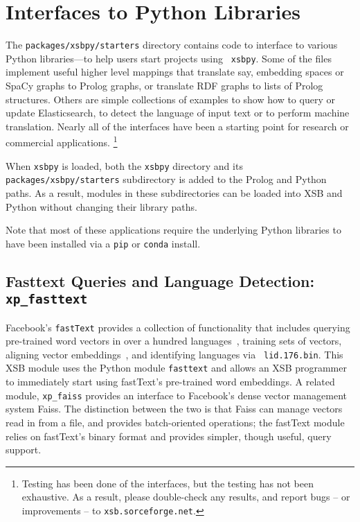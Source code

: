 %

\section{Interfaces to Python Libraries}

The {\tt packages/xsbpy/starters} directory contains code to interface
to various Python libraries---to help users start projects using {\tt
  xsbpy}.  Some of the files implement useful higher level mappings
that translate say, embedding spaces or SpaCy graphs to Prolog graphs,
or translate RDF graphs to lists of Prolog structures.  Others are
simple collections of examples to show how to query or update
Elasticsearch, to detect the language of input text or to perform
machine translation.  Nearly all of the interfaces have been a
starting point for research or commercial
applications.  \footnote{Testing has been done of the interfaces, but
  the testing has not been exhaustive.  As a result, please
  double-check any results, and report bugs -- or improvements -- to
  {\tt xsb.sorceforge.net}.}

When {\tt xsbpy} is loaded, both the {\tt xsbpy} directory and its
{\tt packages/xsbpy/starters} subdirectory is added to the Prolog and
Python paths.  As a result, modules in these subdirectories can be
loaded into XSB and Python without changing their library paths.

Note that most of these applications require the underlying Python
libraries to have been installed via a {\tt pip} or {\tt conda}
install.

\subsection{Fasttext Queries and Language Detection: {\tt xp\_fasttext}}
%
Facebook's {\tt fastText} provides a collection of functionality that
includes querying pre-trained word vectors in over a hundred
languages~\cite{FBFJM18}, training sets of vectors, aligning vector
embeddings~\cite{MUSE2018}, and identifying languages via {\tt
  lid.176.bin}.  This XSB module uses the Python module {\tt fasttext}
and allows an XSB programmer to immediately start using fastText's
pre-trained word embeddings.  A related module, {\tt xp\_faiss}
provides an interface to Facebook's dense vector management system
Faiss.  The distinction between the two is that Faiss can manage
vectors read in from a file, and provides batch-oriented operations;
the fastText module relies on fastText's binary format and provides
simpler, though useful, query support.

